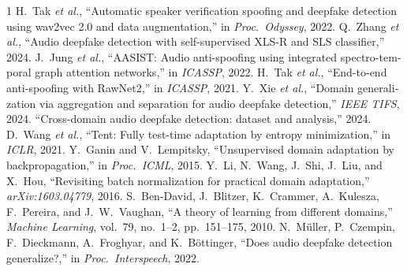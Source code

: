 \documentclass[a4paper,11pt]{article}
\begin{document}
\begin{latin}
\begin{thebibliography}{1}
 H.~Tak \emph{et al.}, ``Automatic speaker verification
spoofing and deepfake detection using wav2vec 2.0 and data augmentation,'' in
\emph{Proc.\ Odyssey}, 2022.
 Q.~Zhang \emph{et al.}, ``Audio deepfake detection with
self-supervised XLS-R and SLS classifier,'' 2024.
 J.~Jung \emph{et al.}, ``AASIST: Audio anti-spoofing using
integrated spectro-temporal graph attention networks,'' in \emph{ICASSP}, 2022.
 H.~Tak \emph{et al.}, ``End-to-end anti-spoofing with RawNet2,''
in \emph{ICASSP}, 2021.
 Y.~Xie \emph{et al.}, ``Domain generalization via aggregation and
separation for audio deepfake detection,'' \emph{IEEE TIFS}, 2024.
 ``Cross-domain audio deepfake detection: dataset and
analysis,'' 2024.
 D.~Wang \emph{et al.}, ``Tent: Fully test-time adaptation by
entropy minimization,'' in \emph{ICLR}, 2021.
 Y.~Ganin and V.~Lempitsky, ``Unsupervised domain adaptation by
backpropagation,'' in \emph{Proc.\ ICML}, 2015.
 Y.~Li, N.~Wang, J.~Shi, J.~Liu, and X.~Hou, ``Revisiting batch
normalization for practical domain adaptation,'' \emph{arXiv:1603.04779}, 2016.
 S.~Ben-David, J.~Blitzer, K.~Crammer, A.~Kulesza,
F.~Pereira, and J.~W.~Vaughan, ``A theory of learning from different
domains,'' \emph{Machine Learning}, vol.\ 79, no.\ 1--2, pp.\ 151--175, 2010.
 N.~M\"uller, P.~Czempin, F.~Dieckmann, A.~Froghyar, and
K.~B\"ottinger, ``Does audio deepfake detection generalize?,'' in \emph{Proc.\
Interspeech}, 2022.
\end{thebibliography}
\end{latin}
\end{document}
